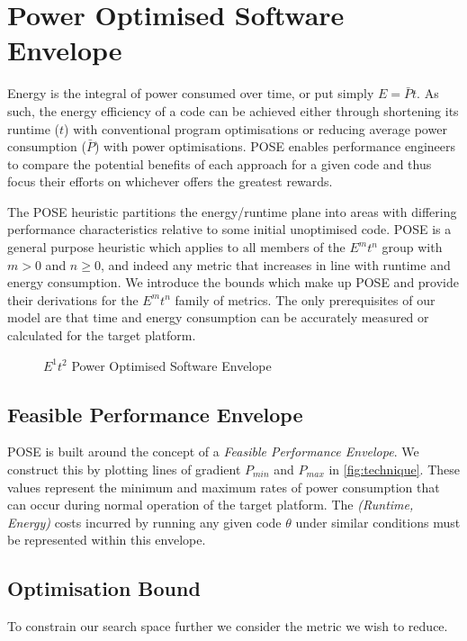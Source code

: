 \section{Power Optimised Software Envelope}
\label{sec:pose}
\noindent
Energy is the integral of power consumed over time, or put simply $E = \bar{P}t$.
As such, the energy efficiency of a code can be achieved either through shortening its runtime ($t$) with conventional program optimisations or reducing average power consumption ($\bar{P}$) with power optimisations.
POSE enables performance engineers to compare the potential benefits of each approach for a given code and thus focus their efforts on whichever offers the greatest rewards.

The POSE heuristic partitions the energy/runtime plane into areas with differing performance characteristics relative to some initial unoptimised code.
POSE is a general purpose heuristic which applies to all members of the $E^mt^n$ group with $m > 0$ and $n \geq 0$, and indeed any metric that increases in line with runtime and energy consumption.
We introduce the bounds which make up POSE and provide their derivations for the $E^mt^n$ family of metrics.
The only prerequisites of our model are that time and energy consumption can be accurately measured or calculated for the target platform.

\begin{figure}
\scriptsize
\centering

\caption{$E^1t^2$ Power Optimised Software Envelope}
\label{fig:technique}
\end{figure}

\subsection{Feasible Performance Envelope}
\noindent
POSE is built around the concept of a \emph{Feasible Performance Envelope}.
We construct this by plotting lines of gradient $P_{min}$ and $P_{max}$ in \autoref{fig:technique}.
These values represent the minimum and maximum rates of power consumption that can occur during normal operation of the target platform.
The \textit{(Runtime, Energy)} costs incurred by running any given code $\theta$ under similar conditions must be represented within this envelope.

\subsection{Optimisation Bound}
\noindent
To constrain our search space further we consider the metric we wish to reduce.

